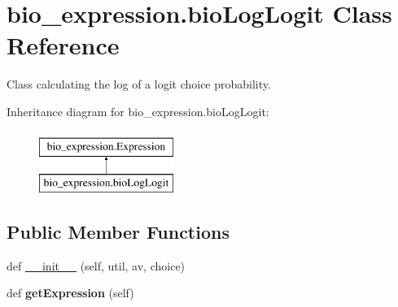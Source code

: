 \hypertarget{classbio__expression_1_1bio_log_logit}{}\section{bio\+\_\+expression.\+bio\+Log\+Logit Class Reference}
\label{classbio__expression_1_1bio_log_logit}


Class calculating the log of a logit choice probability.  


Inheritance diagram for bio\+\_\+expression.\+bio\+Log\+Logit\+:\begin{figure}[H]
\begin{center}
\leavevmode
\includegraphics[height=2.000000cm]{classbio__expression_1_1bio_log_logit}
\end{center}
\end{figure}
\subsection*{Public Member Functions}
\begin{DoxyCompactItemize}
\item 
def \hyperlink{classbio__expression_1_1bio_log_logit_a11e021d5eb0326fcda189b53d694d689}{\+\_\+\+\_\+init\+\_\+\+\_\+} (self, util, av, choice)
\item 
def {\bfseries get\+Expression} (self)\hypertarget{classbio__expression_1_1bio_log_logit_a3a60714712d99147fb6ef10d0d25cd63}{}\label{classbio__expression_1_1bio_log_logit_a3a60714712d99147fb6ef10d0d25cd63}

\end{DoxyCompactItemize}
